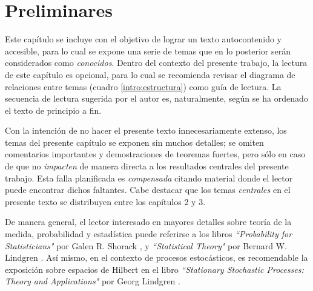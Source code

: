 \documentclass[12pt,letterpaper]{book}
\begin{document}


\chapter{Preliminares}

Este capítulo se incluye con el objetivo de lograr un texto autocontenido y accesible, para lo cual se expone una serie de temas que en lo posterior serán considerados como \textit{conocidos}.
%
Dentro del contexto del presente trabajo, la lectura de este capítulo es opcional, para lo cual se recomienda revisar el diagrama de relaciones entre temas (cuadro \ref{intro:estructura}) como guía de lectura.
%
La secuencia de lectura sugerida por el autor es, naturalmente, según se ha ordenado el texto de principio a fin.

Con la intención de no hacer el presente texto innecesariamente extenso, los temas del presente capítulo se exponen sin muchos detalles; se omiten comentarios importantes y demostraciones de teoremas fuertes, pero sólo en caso de que no \textit{impacten} de manera directa a los resultados centrales del presente trabajo.
%
Esta falla planificada es \textit{compensada} citando material donde el lector puede encontrar dichos faltantes.
%
Cabe destacar que los temas \textit{centrales} en el presente texto se distribuyen entre los capítulos 2 y 3.

De manera general, el lector interesado en mayores detalles sobre teoría de la medida, probabilidad y estadística puede referirse a los libros \textit{``Probability for Statisticians"} por Galen R. Shorack \cite{probabilidad_shorack}, y \textit{``Statistical Theory"} por Bernard W. Lindgren \cite{estadistica_lindgren}.
%
Así mismo, en el contexto de procesos estocásticos, es recomendable la exposición sobre espacios de Hilbert en el libro \textit{``Stationary Stochastic Processes: Theory and Applications"} por Georg Lindgren \cite{estacionariedad_lindgren}.
\end{document}
